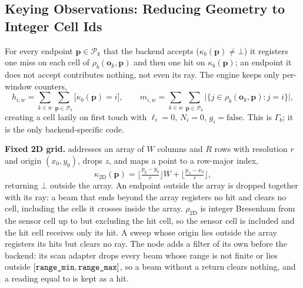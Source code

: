 \subsection{Keying Observations: Reducing Geometry to Integer Cell Ids}\label{subsec:keying}

For every endpoint $\mathbf{p}\in\mathcal{P}_k$ that the backend accepts ($\kappa_b(\mathbf{p})\ne\bot$) it registers one miss on each cell of $\rho_b(\mathbf{o}_k,\mathbf{p})$ and then one hit on $\kappa_b(\mathbf{p})$; an endpoint it does not accept contributes nothing, not even its ray. The engine keeps only per-window counters,
\begin{equation}\label{eq:gamma}
  h_{i,w}=\sum_{k\in w}\sum_{\mathbf{p}\in\mathcal{P}_k}\big[\kappa_b(\mathbf{p})=i\big],\qquad
  m_{i,w}=\sum_{k\in w}\sum_{\mathbf{p}\in\mathcal{P}_k}\big|\{j\in\rho_b(\mathbf{o}_k,\mathbf{p}) : j=i\}\big|,
\end{equation}
creating a cell lazily on first touch with $\ell_i=0$, $N_i=0$, $g_i=\text{false}$. This is $\Gamma_b$; it is the only backend-specific code.

\noindent\textbf{Fixed 2D grid.}  addresses an array of $W$ columns and $R$ rows with resolution $r$ and origin $(x_0,y_0)$, drops $z$, and maps a point to a row-major index,
\begin{equation}\label{eq:key2d}
  \kappa_{\mathrm{2D}}(\mathbf{p})=\Big\lfloor\tfrac{p_y-y_0}{r}\Big\rfloor W+\Big\lfloor\tfrac{p_x-x_0}{r}\Big\rfloor,
\end{equation}
returning $\bot$ outside the array. An endpoint outside the array is dropped together with its ray: a beam that ends beyond the array registers no hit and clears no cell, including the cells it crosses inside the array. $\rho_{\mathrm{2D}}$ is integer Bresenham \citep{bresenham1965} from the sensor cell up to but excluding the hit cell, so the sensor cell is included and the hit cell receives only its hit. A sweep whose origin lies outside the array registers its hits but clears no ray. The node adds a filter of its own before the backend: its scan adapter drops every beam whose range is not finite or lies outside $[\texttt{range\_min},\texttt{range\_max}]$, so a beam without a return clears nothing, and a reading equal to  is kept as a hit.

